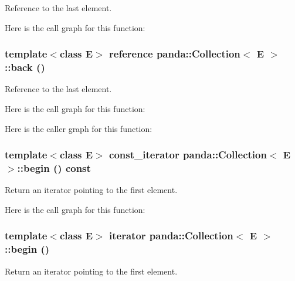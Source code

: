 Reference to the last element. 

Here is the call graph for this function:\hypertarget{classpanda_1_1Collection_aa4035dd7ed5695992a3f0340feede2c8}{
\subsubsection[{back}]{\setlength{\rightskip}{0pt plus 5cm}template$<$class E$>$ {\bf reference} {\bf panda::Collection}$<$ E $>$::back ()}}
\label{classpanda_1_1Collection_aa4035dd7ed5695992a3f0340feede2c8}


Reference to the last element. 

Here is the call graph for this function:

Here is the caller graph for this function:\hypertarget{classpanda_1_1Collection_adfb529320065335b26ad488ab58e30e4}{
\subsubsection[{begin}]{\setlength{\rightskip}{0pt plus 5cm}template$<$class E$>$ {\bf const\_\-iterator} {\bf panda::Collection}$<$ E $>$::begin () const}}
\label{classpanda_1_1Collection_adfb529320065335b26ad488ab58e30e4}


Return an iterator pointing to the first element. 

Here is the call graph for this function:\hypertarget{classpanda_1_1Collection_a353e28bfcd4afe0d3cf9f949bffe21dc}{
\subsubsection[{begin}]{\setlength{\rightskip}{0pt plus 5cm}template$<$class E$>$ {\bf iterator} {\bf panda::Collection}$<$ E $>$::begin ()}}
\label{classpanda_1_1Collection_a353e28bfcd4afe0d3cf9f949bffe21dc}


Return an iterator pointing to the first element. 

